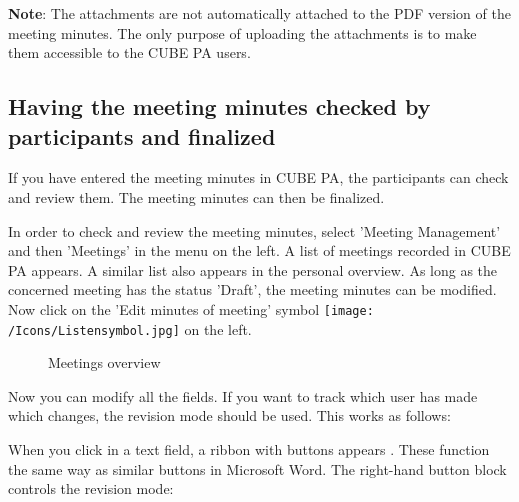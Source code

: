 \vspace{\baselineskip}

\textbf{Note}: The attachments are not automatically attached to the PDF version of the meeting minutes. The only purpose of uploading the attachments is to make them accessible to the CUBE PA users.

\subsection{Having the meeting minutes checked by participants and finalized}
\label{bkm:Ref434478117}
If you have entered the meeting minutes in CUBE PA, the participants can check and review them. The meeting minutes can then be finalized.

\vspace{\baselineskip}

In order to check and review the meeting minutes, select 'Meeting Management' and then 'Meetings' in the menu on the left. A list of meetings recorded in CUBE PA appears. A similar list also appears in the personal overview. As long as the concerned meeting has the status 'Draft', the meeting minutes can be modified. Now click on the 'Edit minutes of meeting' symbol \texttt{[image: /Icons/Listensymbol.jpg]}  on the left.

\begin{figure}[H]
\caption{Meetings overview}
\end{figure}

\vspace{\baselineskip}

Now you can modify all the fields. If you want to track which user has made which changes, the revision mode should be used. This works as follows:

\vspace{\baselineskip}

When you click in a text field, a ribbon with buttons appears . These function the same way as similar buttons in Microsoft Word. The right-hand button block controls the revision mode:

